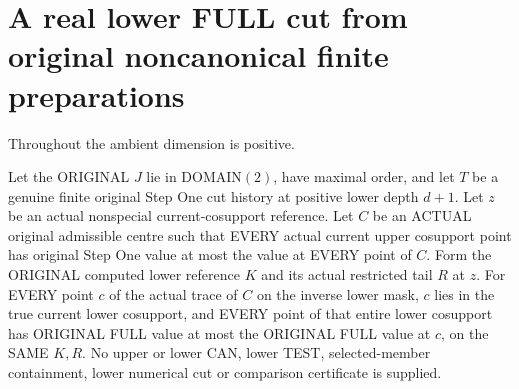 \section{A real lower FULL cut from original noncanonical finite preparations}

Throughout the ambient dimension is positive.
\begin{theorem}
\label{hir:original-finite-cut-inherited-lower-full-values}
\leanok
Let the ORIGINAL $J$ lie in DOMAIN$(2)$, have maximal order, and let $T$
be a genuine finite original Step One cut history at positive lower depth
$d+1$. Let $z$ be an actual nonspecial current-cosupport reference. Let
$C$ be an ACTUAL original admissible centre such that EVERY actual current
upper cosupport point has original Step One value at most the value at
EVERY point of $C$. Form the ORIGINAL computed lower reference $K$ and
its actual restricted tail $R$ at $z$. For EVERY point $c$ of the actual
trace of $C$ on the inverse lower mask, $c$ lies in the true current lower
cosupport, and EVERY point of that entire lower cosupport has ORIGINAL
FULL value at most the ORIGINAL FULL value at $c$, on the SAME $K,R$.
No upper or lower CAN, lower TEST, selected-member containment, lower
numerical cut or comparison certificate is supplied.
\end{theorem}
